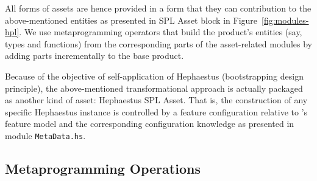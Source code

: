All forms of assets are hence provided in a form that they can contribution to the above-mentioned entities as presented in SPL Asset block in Figure~\ref{fig:modules-hpl}. We use metaprogramming operators that build the product's entities (say, types and functions) from the corresponding parts of the asset-related modules by adding parts incrementally to the base product.

Because of the objective of self-application of Hephaestus (bootstrapping design principle), the above-mentioned transformational approach is actually packaged as another kind of asset: Hephaestus SPL Asset. That is, the construction of any specific Hephaestus instance is controlled by a feature configuration relative to \hpl's feature model and the corresponding configuration knowledge as presented in module \texttt{MetaData.hs}.


\subsection{Metaprogramming Operations} \label{sec:metaprogrammingOperations}

